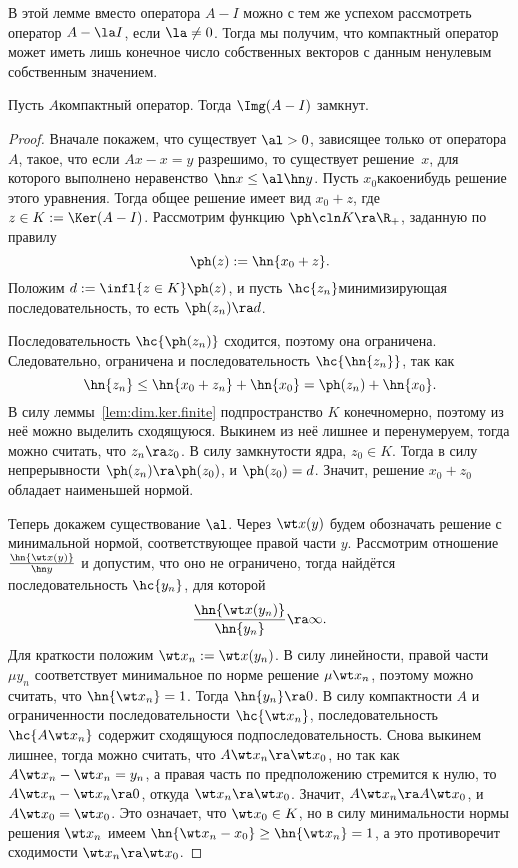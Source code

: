 \documentclass[a4paper]{article}
\begin{document}
\begin{note}
В этой лемме вместо оператора $A-I$ можно с тем же успехом рассмотреть оператор $A - \la I$,
если $\la \neq 0$. Тогда мы получим, что компактный оператор может иметь лишь конечное число собственных векторов
с данным ненулевым собственным значением.
\end{note}


\begin{lemma}\label{lem:cl.image}
Пусть $A$\т компактный оператор. Тогда $\Img(A-I)$ замкнут.
\end{lemma}
\begin{proof}
Вначале покажем, что существует $\al > 0$, зависящее только от оператора $A$, такое,
что если $Ax - x = y$ разрешимо, то существует решение~$x$, для которого выполнено неравенство
$\hn x \le \al \hn y$.
Пусть $x_0$\т какое\д нибудь решение этого уравнения. Тогда общее решение имеет
вид $x_0 + z$, где $z \in K := \Ker(A-I)$. Рассмотрим функцию $\ph\cln K \ra \R_+$, заданную по правилу
$$\ph(z) := \hn{x_0 + z}.$$
Положим $d := \infl{z \in K} \ph(z)$, и пусть $\hc{z_n}$\т минимизирующая последовательность,
то есть $\ph(z_n) \ra d$.

Последовательность $\hc{\ph(z_n)}$ сходится, поэтому она ограничена. Следовательно,
ограничена и последовательность $\hc{\hn{z_n}}$, так как
$$\hn{z_n} \le \hn{x_0 + z_n} + \hn{x_0} = \ph(z_n) + \hn{x_0}.$$
В силу леммы~\ref{lem:dim.ker.finite} подпространство $K$ конечномерно, поэтому
из неё можно выделить сходящуюся. Выкинем из неё лишнее и перенумеруем, тогда
можно считать, что $z_n \ra z_0$. В силу замкнутости ядра, $z_0 \in K$.
Тогда в силу непрерывности $\ph(z_n) \ra \ph(z_0)$, и $\ph(z_0) = d$.
Значит, решение $x_0 + z_0$ обладает наименьшей нормой.

Теперь докажем существование $\al$. Через $\wt x(y)$ будем обозначать решение с минимальной нормой,
соответствующее правой части $y$. Рассмотрим отношение $\frac{\hn{\wt x(y)}}{\hn y}$ и допустим,
что оно не ограничено, тогда найдётся последовательность $\hc{y_n}$, для которой
$$\frac{\hn{\wt x(y_n)}}{\hn{y_n}} \ra \infty.$$
Для краткости положим $\wt x_n := \wt x(y_n)$.
В силу линейности, правой части $\mu y_n$ соответствует минимальное по норме решение $\mu \wt x_n$,
поэтому можно считать, что $\hn{\wt x_n} = 1$. Тогда $\hn{y_n} \ra 0$.
В силу компактности $A$ и ограниченности последовательности $\hc{\wt x_n}$,
последовательность $\hc{A\wt x_n}$ содержит сходящуюся подпоследовательность.
Снова выкинем лишнее, тогда можно считать, что $A\wt x_n \ra \wt x_0$,
но так как $A\wt x_n - \wt x_n = y_n$, а правая часть по предположению стремится к нулю,
то $A\wt x_n -\wt x_n \ra 0$, откуда $\wt x_n \ra \wt x_0$. Значит, $A\wt x_n \ra A\wt x_0$,
и $A \wt x_0 = \wt x_0$. Это означает, что  $\wt x_0 \in K$,
но в силу минимальности нормы решения $\wt x_n$ имеем
$\hn{\wt x_n - x_0} \ge \hn{\wt x_n} = 1$, а это противоречит сходимости $\wt x_n \ra \wt x_0$.


\end{proof}
\end{document}
